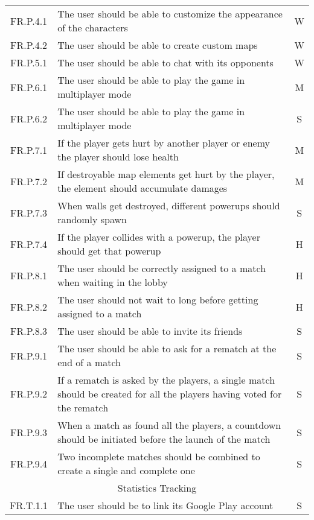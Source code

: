\begin{center}
\begin{longtable}[c]{cp{12cm}c}
      FR.P.4.1 & The user should be able to customize the appearance of the characters & W \\
      FR.P.4.2 & The user should be able to create custom maps & W \\

      FR.P.5.1 & The user should be able to chat with its opponents & W \\

      FR.P.6.1 & The user should be able to play the game in multiplayer mode & M \\
      FR.P.6.2 & The user should be able to play the game in multiplayer mode & S \\

      FR.P.7.1 & If the player gets hurt by another player or enemy the player should lose health & M \\
      FR.P.7.2 & If destroyable map elements get hurt by the player, the element should accumulate damages & M \\
      FR.P.7.3 & When walls get destroyed, different powerups should randomly spawn & S \\
      FR.P.7.4 & If the player collides with a powerup, the player should get that powerup & H \\

      FR.P.8.1 & The user should be correctly assigned to a match when waiting in the lobby & H \\
      FR.P.8.2 & The user should not wait to long before getting assigned to a match & H \\
      FR.P.8.3 & The user should be able to invite its friends & S \\

      FR.P.9.1 & The user should be able to ask for a rematch at the end of a match & S \\
      FR.P.9.2 & If a rematch is asked by the players, a single match should be created for all the players having voted for the rematch & S \\
      FR.P.9.3 & When a match as found all the players, a countdown should be initiated before the launch of the match & S \\
      FR.P.9.4 & Two incomplete matches should be combined to create a single and complete one & S \\

    \midrule
      \multicolumn{3}{c}{Statistics Tracking} \\
    \midrule
      FR.T.1.1 & The user should be to link its Google Play account & S \\


\end{longtable}
\end{center}
